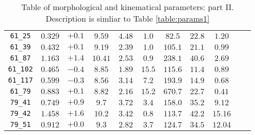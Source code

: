 \begin{table}[htbp]
\begin{tabular}{c c c c c c c c c c c}
\texttt{61\_25}         & $0.329$ & $+0.1$ & $9.59 $ & $4.48 $ & $1.0 $ & $82.5 $ & $22.8$ & $1.20$ \\
\texttt{61\_39}         & $0.432$ & $+0.1$ & $9.19 $ & $2.39 $ & $1.0 $ & $105.1$ & $21.1$ & $0.99$ \\
\texttt{61\_87}         & $1.163$ & $+1.4$ & $10.41$ & $2.53 $ & $0.9 $ & $238.1$ & $40.6$ & $2.69$ \\
\texttt{61\_102}        & $0.465$ & $-0.4$ & $8.85 $ & $1.89 $ & $15.5$ & $115.6$ & $11.4$ & $0.89$ \\
\texttt{61\_117}        & $0.599$ & $-0.3$ & $8.56 $ & $3.14 $ & $7.2 $ & $193.9$ & $14.9$ & $0.68$ \\
\texttt{61\_79}         & $0.883$ & $+0.1$ & $8.82 $ & $2.16 $ & $15.2$ & $670.7$ & $22.7$ & $0.41$ \\
\texttt{79\_41}         & $0.749$ & $+0.9$ & $9.7  $ & $3.72 $ & $3.4 $ & $158.0$ & $35.2$ & $9.12$ \\
\texttt{79\_42}         & $1.458$ & $+1.6$ & $10.2 $ & $3.42 $ & $0.8 $ & $113.7$ & $42.2$ & $15.16$ \\
\texttt{79\_51}         & $0.912$ & $+0.0$ & $9.3  $ & $2.82 $ & $3.7 $ & $124.7$ & $34.5$ & $12.04$ \\


	\end{tabular}
\caption[Morpho-kinematical parameters II]{Table of morphological and kinematical parameters: part II. Description is simliar to Table \ref{table:params1}}
\label{table:params2}
\end{table}


